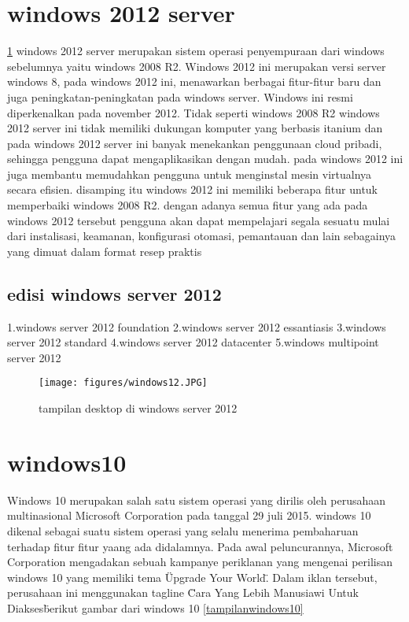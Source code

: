 	\section{windows 2012 server}
		\ref{windows12} windows 2012 server merupakan sistem operasi penyempuraan dari windows sebelumnya yaitu windows 2008 R2. Windows 2012 ini merupakan versi server windows 8, pada windows 2012 ini, 
		menawarkan berbagai fitur-fitur baru dan juga peningkatan-peningkatan pada windows server. Windows ini resmi diperkenalkan pada november 2012. Tidak seperti windows 2008 R2 windows 
		2012 server ini tidak memiliki dukungan komputer yang berbasis itanium dan pada windows 2012 server ini banyak menekankan penggunaan cloud pribadi, sehingga pengguna dapat 
		mengaplikasikan dengan mudah. pada windows 2012 ini juga membantu memudahkan pengguna untuk menginstal mesin virtualnya secara efisien. disamping itu windows 2012 ini memiliki beberapa
		fitur untuk memperbaiki windows 2008 R2. dengan adanya semua fitur yang ada pada windows 2012 tersebut pengguna akan dapat mempelajari segala sesuatu mulai dari instalisasi, 
		keamanan, konfigurasi otomasi, pemantauan dan lain sebagainya yang dimuat dalam format resep praktis\cite{carvalho2012windows}
		\subsection{edisi windows server 2012}
			1.windows server 2012 foundation
			2.windows server 2012 essantiasis
			3.windows server 2012 standard
			4.windows server 2012 datacenter
			5.windows multipoint server 2012

\begin{figure}[ht]
\centerline{\texttt{[image: figures/windows12.JPG]}}
\caption{tampilan desktop di windows server 2012}
\label{windows12}
\end{figure}

	
	\section{windows10}
		Windows 10 merupakan salah satu sistem operasi yang dirilis oleh perusahaan multinasional Microsoft Corporation pada tanggal 29 juli 2015. windows 10 dikenal sebagai suatu sistem 
		operasi yang selalu menerima pembaharuan terhadap fitur fitur yaang ada didalamnya. Pada awal peluncurannya, Microsoft Corporation mengadakan sebuah kampanye periklanan yang 
		mengenai perilisan windows 10 yang memiliki tema \"Upgrade Your World\". Dalam iklan tersebut, perusahaan ini menggunakan tagline \"Cara Yang Lebih Manusiawi Untuk Diakses\" berikut gambar dari windows 10 \ref{tampilanwindows10}
